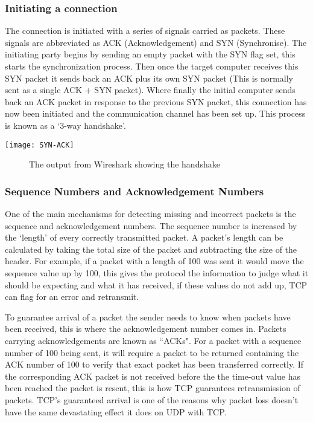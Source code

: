 \subsubsection*{Initiating a connection}
The connection is initiated with a series of signals carried as packets. These signals are abbreviated as ACK (Acknowledgement) and SYN (Synchronise). The initiating party begins by sending an empty packet with the SYN flag set, this starts the synchronization process. Then once the target computer receives this SYN packet it sends back an ACK plus its own SYN packet (This is normally sent as a single ACK + SYN packet). Where finally the initial computer sends back an ACK packet in response to the previous SYN packet, this connection has now been initiated and the communication channel has been set up. This process is known as a `3-way handshake'.

\begin{center}
	\texttt{[image: SYN-ACK]}
	\begin{figure}[h]
		\caption{The output from Wireshark showing the handshake}
	\end{figure}
\end{center}


\subsubsection*{Sequence Numbers and Acknowledgement Numbers}
One of the main mechanisms for detecting missing and incorrect packets is the sequence and acknowledgement numbers. The sequence number is increased by the `length' of every correctly transmitted packet. A packet's length can be calculated by taking the total size of the packet and subtracting the size of the header. For example, if a packet with a length of 100 was sent it would move the sequence value up by 100, this gives the protocol the information to judge what it should be expecting and what it has received, if these values do not add up, TCP can flag for an error and retransmit.

To guarantee arrival of a packet the sender needs to know when packets have been received, this is where the acknowledgement number comes in. Packets carrying acknowledgements are known as ``ACKs". For a packet with a sequence number of 100 being sent, it will require a packet to be returned containing the ACK number of 100 to verify that exact packet has been transferred correctly. If the corresponding ACK packet is not received before the the time-out value has been reached the packet is resent, this is how TCP guarantees retransmission of packets. TCP's guaranteed arrival is one of the reasons why packet loss doesn't have the same devastating effect it does on UDP with TCP.

